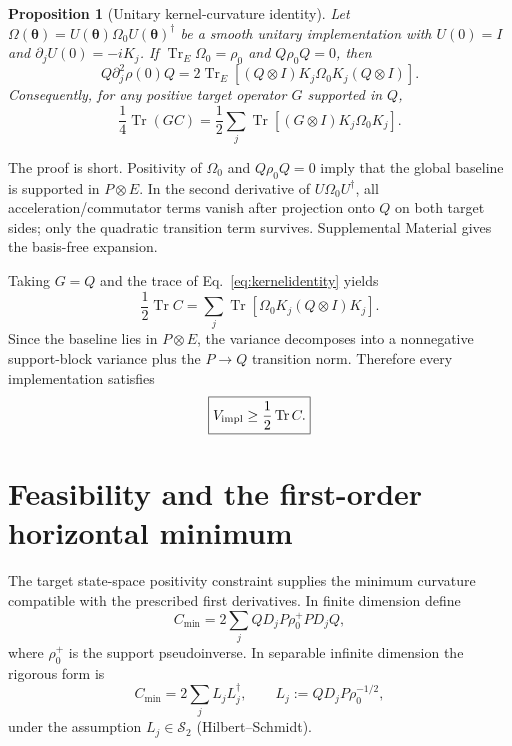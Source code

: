 \documentclass[aps,pra,preprint,nofootinbib]{revtex4-2}
\newtheorem{proposition}{Proposition}
\newcommand{\Tr}{\operatorname{Tr}}
\newcommand{\rhozero}{\rho_0}
\newcommand{\Omegazero}{\Omega_0}
\newcommand{\Vimpl}{V_{\rm impl}}
\newcommand{\Cmin}{C_{\min}}
\newcommand{\Cker}{C}
\begin{document}
\begin{proposition}[Unitary kernel-curvature identity]
Let $\Omega(\bm\theta)=U(\bm\theta)\Omegazero U(\bm\theta)^\dagger$ be a smooth unitary implementation with $U(0)=I$ and $\partial_jU(0)=-iK_j$. If $\Tr_E\Omegazero=\rhozero$ and $Q\rhozero Q=0$, then
\begin{equation}
 Q\partial_j^2\rho(0)Q
 =2\Tr_E\!\left[(Q\otimes I)K_j\Omegazero K_j(Q\otimes I)\right].
 \label{eq:kernelidentity}
\end{equation}
Consequently, for any positive target operator $G$ supported in $Q$,
\begin{equation}
 \frac14\Tr(G\Cker)
 =\frac12\sum_j\Tr\!\left[(G\otimes I)K_j\Omegazero K_j\right].
 \label{eq:weightedidentity}
\end{equation}
\end{proposition}

\noindent
The proof is short. Positivity of $\Omegazero$ and $Q\rhozero Q=0$ imply that the global baseline is supported in $P\otimes E$. In the second derivative of $U\Omegazero U^\dagger$, all acceleration/commutator terms vanish after projection onto $Q$ on both target sides; only the quadratic transition term survives. Supplemental Material gives the basis-free expansion.

Taking $G=Q$ and the trace of Eq.~\eqref{eq:kernelidentity} yields
\begin{equation}
 \frac12\Tr\Cker
 =\sum_j\Tr[\Omegazero K_j(Q\otimes I)K_j].
 \label{eq:kerneltrace}
\end{equation}
Since the baseline lies in $P\otimes E$, the variance decomposes into a nonnegative support-block variance plus the $P\to Q$ transition norm. Therefore every implementation satisfies
\begin{equation}
 \boxed{\Vimpl\ge\frac12\Tr\Cker.}
 \label{eq:universal-lower}
\end{equation}

\section{Feasibility and the first-order horizontal minimum}

The target state-space positivity constraint supplies the minimum curvature compatible with the prescribed first derivatives. In finite dimension define
\begin{equation}
 \Cmin
 =2\sum_j QD_jP\rhozero^+PD_jQ,
 \label{eq:Cmin}
\end{equation}
where $\rhozero^+$ is the support pseudoinverse. In separable infinite dimension the rigorous form is
\begin{equation}
 \Cmin=2\sum_j L_jL_j^\dagger,
 \qquad
 L_j:=QD_jP\rhozero^{-1/2},
 \label{eq:CminHS}
\end{equation}
under the assumption $L_j\in\mathcal S_2$ (Hilbert--Schmidt).
\end{document}
